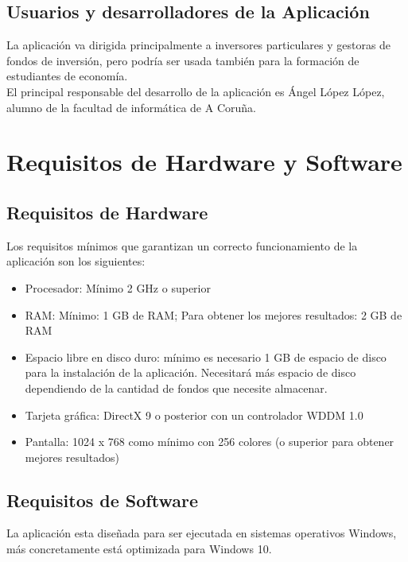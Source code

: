 \documentclass[12pt, a4paper]{book}
\begin{document}
\subsection{Usuarios y desarrolladores de la Aplicación}

La aplicación va dirigida principalmente a inversores particulares y gestoras de fondos de inversión, pero podría ser usada también para la formación de estudiantes de economía.\\

El principal responsable del desarrollo de la aplicación es Ángel López López, alumno de la facultad de informática de A Coruña.

\section{Requisitos de Hardware y Software}

\subsection{Requisitos de Hardware}

Los requisitos mínimos que garantizan un correcto funcionamiento de la aplicación son los siguientes:

\begin{itemize}
	\item Procesador: Mínimo 2 GHz o superior
	\item RAM: Mínimo: 1 GB de RAM; Para obtener los mejores resultados: 2 GB de RAM
	\item Espacio libre en disco duro: mínimo es necesario 1 GB de espacio de disco para la instalación de la aplicación. Necesitará más espacio de disco dependiendo de la cantidad de fondos que necesite almacenar. 
	\item Tarjeta gráfica: DirectX 9 o posterior con un controlador WDDM 1.0
	\item Pantalla:	1024 x 768 como mínimo con 256 colores (o superior para obtener mejores resultados)
\end{itemize}

\subsection{Requisitos de Software}

La aplicación esta diseñada para ser ejecutada en sistemas operativos Windows, más concretamente está optimizada para Windows 10.\\
\end{document}
